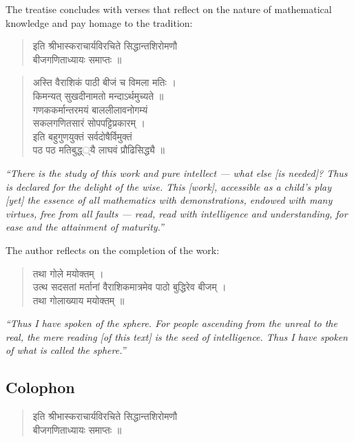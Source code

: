 \documentclass[11pt,a4paper]{article}
\newcommand{\cnote}[1]{\textcolor{notecolor}{\textit{#1}}}
\newcommand{\dev}[1]{{\devanagarifont #1}}
\newenvironment{sanskritverse}{%
  \begin{verse}
}{%
  \end{verse}
}
\begin{document}
The treatise concludes with verses that reflect on the nature of mathematical knowledge and pay homage to the tradition:

\begin{sanskritverse}
\dev{%
इति श्रीभास्कराचार्यविरचिते सिद्धान्तशिरोमणौ\\
बीजगणिताध्यायः समाप्तः ॥}
\end{sanskritverse}

\begin{sanskritverse}
\dev{%
अस्ति वैराशिकं पाठी बीजं च विमला मतिः ।\\
किमन्यत् सुखदीनामतो मन्दाऽर्थमुच्यते ॥\\[0.5em]
गणककर्मान्तरमयं बाललीलावनोगम्यं\\
सकलगणितसारं सोपपट्टिप्रकारम् ।\\
इति बहुगुणयुक्तं सर्वदोषैर्विमुक्तं\\
पठ पठ मतिबुद्ध्‌्यै लाघवं प्रौढिसिद्ध्यै ॥}
\end{sanskritverse}

\cnote{``There is the study of this work and pure intellect --- what else [is needed]? Thus is declared for the delight of the wise. This [work], accessible as a child's play [yet] the essence of all mathematics with demonstrations, endowed with many virtues, free from all faults --- read, read with intelligence and understanding, for ease and the attainment of maturity.''}

\bigskip

The author reflects on the completion of the work:

\begin{sanskritverse}
\dev{%
तथा गोले मयोक्तम् ।\\
उत्थ सदसतां मर्तानां वैराशिकमात्रमेव पाठो बुद्धिरेव बीजम् ।\\
तथा गोलाख्याय मयोक्तम् ॥}
\end{sanskritverse}

\cnote{``Thus I have spoken of the sphere. For people ascending from the unreal to the real, the mere reading [of this text] is the seed of intelligence. Thus I have spoken of what is called the sphere.''}

\subsection*{Colophon}

\begin{sanskritverse}
\dev{%
इति श्रीभास्कराचार्यविरचिते सिद्धान्तशिरोमणौ\\
बीजगणिताध्यायः समाप्तः ॥}
\end{sanskritverse}
\end{document}
